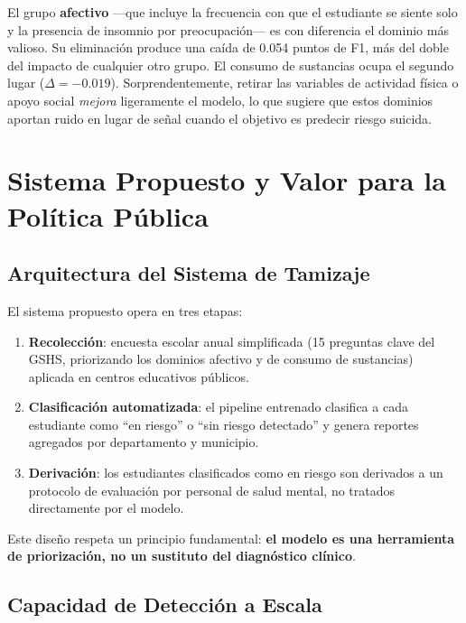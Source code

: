 \documentclass[conference]{IEEEtran}
\begin{document}
El grupo \textbf{afectivo} ---que incluye la frecuencia con que el estudiante se siente solo y la presencia de insomnio por preocupación--- es con diferencia el dominio más valioso. Su eliminación produce una caída de 0.054 puntos de F1, más del doble del impacto de cualquier otro grupo. El consumo de sustancias ocupa el segundo lugar ($\Delta = -0.019$). Sorprendentemente, retirar las variables de actividad física o apoyo social \textit{mejora} ligeramente el modelo, lo que sugiere que estos dominios aportan ruido en lugar de señal cuando el objetivo es predecir riesgo suicida.

\section{Sistema Propuesto y Valor para la Política Pública}

\subsection{Arquitectura del Sistema de Tamizaje}

El sistema propuesto opera en tres etapas:

\begin{enumerate}
  \item \textbf{Recolección}: encuesta escolar anual simplificada (15 preguntas clave del GSHS, priorizando los dominios afectivo y de consumo de sustancias) aplicada en centros educativos públicos.
  \item \textbf{Clasificación automatizada}: el pipeline entrenado clasifica a cada estudiante como ``en riesgo'' o ``sin riesgo detectado'' y genera reportes agregados por departamento y municipio.
  \item \textbf{Derivación}: los estudiantes clasificados como en riesgo son derivados a un protocolo de evaluación por personal de salud mental, no tratados directamente por el modelo.
\end{enumerate}

Este diseño respeta un principio fundamental: \textbf{el modelo es una herramienta de priorización, no un sustituto del diagnóstico clínico}.

\subsection{Capacidad de Detección a Escala}
\end{document}
